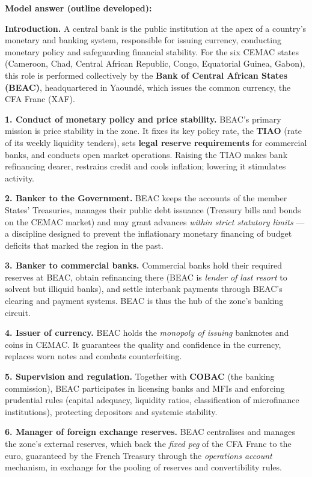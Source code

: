 \documentclass[11pt]{article}
\begin{document}
\begin{corrige}
\textbf{Model answer (outline developed):}

\textbf{Introduction.} A central bank is the public institution at the apex of a country's monetary and banking system, responsible for issuing currency, conducting monetary policy and safeguarding financial stability. For the six CEMAC states (Cameroon, Chad, Central African Republic, Congo, Equatorial Guinea, Gabon), this role is performed collectively by the \textbf{Bank of Central African States (BEAC)}, headquartered in Yaoundé, which issues the common currency, the CFA Franc (XAF).

\textbf{1. Conduct of monetary policy and price stability.} BEAC's primary mission is price stability in the zone. It fixes its key policy rate, the \textbf{TIAO} (rate of its weekly liquidity tenders), sets \textbf{legal reserve requirements} for commercial banks, and conducts open market operations. Raising the TIAO makes bank refinancing dearer, restrains credit and cools inflation; lowering it stimulates activity.

\textbf{2. Banker to the Government.} BEAC keeps the accounts of the member States' Treasuries, manages their public debt issuance (Treasury bills and bonds on the CEMAC market) and may grant advances \emph{within strict statutory limits} — a discipline designed to prevent the inflationary monetary financing of budget deficits that marked the region in the past.

\textbf{3. Banker to commercial banks.} Commercial banks hold their required reserves at BEAC, obtain refinancing there (BEAC is \emph{lender of last resort} to solvent but illiquid banks), and settle interbank payments through BEAC's clearing and payment systems. BEAC is thus the hub of the zone's banking circuit.

\textbf{4. Issuer of currency.} BEAC holds the \emph{monopoly of issuing} banknotes and coins in CEMAC. It guarantees the quality and confidence in the currency, replaces worn notes and combats counterfeiting.

\textbf{5. Supervision and regulation.} Together with \textbf{COBAC} (the banking commission), BEAC participates in licensing banks and MFIs and enforcing prudential rules (capital adequacy, liquidity ratios, classification of microfinance institutions), protecting depositors and systemic stability.

\textbf{6. Manager of foreign exchange reserves.} BEAC centralises and manages the zone's external reserves, which back the \emph{fixed peg} of the CFA Franc to the euro, guaranteed by the French Treasury through the \emph{operations account} mechanism, in exchange for the pooling of reserves and convertibility rules.


\end{corrige}
\end{document}
